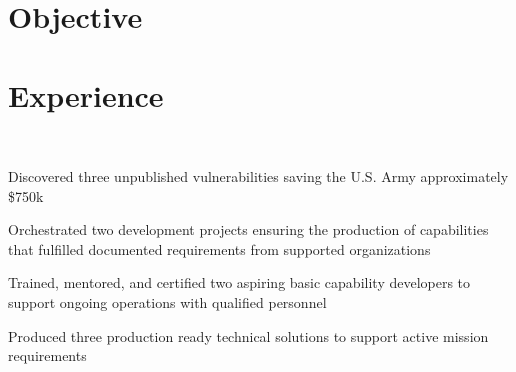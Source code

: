 \documentclass[]{resume}
\begin{document}
\begin{minipage}[t]{0.69\textwidth}

\section{Objective}

\sectionsep

\section{Experience}

 \\
\vspace{\topsep} %
\begin{tightemize}
\item Discovered three unpublished vulnerabilities saving the U.S. Army approximately \$750k
\item Orchestrated two development projects ensuring the production of capabilities that fulfilled documented requirements from supported organizations 
\item Trained, mentored, and certified two aspiring basic capability developers to support ongoing operations with qualified personnel
\item Produced three production ready technical solutions to support active mission requirements
\end{tightemize}

\sectionsep


\end{minipage}
\end{document}
